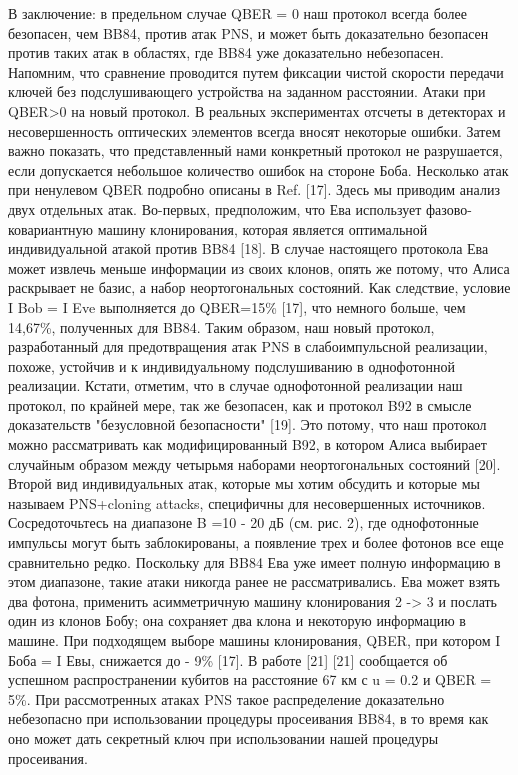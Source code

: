 В заключение: в предельном случае QBER = 0 наш протокол всегда более безопасен, чем BB84, против атак PNS, и может быть доказательно безопасен против таких атак в областях, где BB84 уже доказательно небезопасен. Напомним, что сравнение проводится путем фиксации чистой скорости передачи ключей без подслушивающего устройства на заданном расстоянии.
Атаки при QBER>0 на новый протокол. В реальных экспериментах отсчеты в детекторах и несовершенность оптических элементов всегда вносят некоторые ошибки.
Затем важно показать, что представленный нами конкретный протокол не разрушается, если допускается небольшое количество ошибок на стороне Боба. Несколько атак при ненулевом QBER подробно описаны в Ref. [17]. Здесь мы приводим анализ двух отдельных атак.
Во-первых, предположим, что Ева использует фазово-ковариантную машину клонирования, которая является оптимальной индивидуальной атакой против BB84 [18]. В случае настоящего протокола Ева может извлечь меньше информации из своих клонов, опять же потому, что Алиса раскрывает не базис, а набор неортогональных состояний. Как следствие, условие I Bob = I Eve выполняется до QBER=15\% [17], что немного больше, чем 14,67\%, полученных для BB84. Таким образом, наш новый протокол, разработанный для предотвращения атак PNS в слабоимпульсной реализации, похоже, устойчив и к индивидуальному подслушиванию в однофотонной реализации. Кстати, отметим, что в случае однофотонной реализации наш протокол, по крайней мере, так же безопасен, как и протокол B92 в смысле доказательств "безусловной безопасности" [19]. Это потому, что наш протокол можно рассматривать как модифицированный B92, в котором Алиса выбирает случайным образом между четырьмя наборами неортогональных состояний [20].
Второй вид индивидуальных атак, которые мы хотим обсудить и которые мы называем PNS+cloning attacks, специфичны для несовершенных источников. Сосредоточьтесь на диапазоне B =10 - 20 дБ (см. рис. 2), где однофотонные импульсы могут быть заблокированы, а появление трех и более фотонов все еще сравнительно редко. Поскольку для BB84 Ева уже имеет полную информацию в этом диапазоне, такие атаки никогда ранее не рассматривались. Ева может взять два фотона, применить асимметричную машину клонирования 2 -> 3 и послать один из клонов Бобу; она сохраняет два клона и некоторую информацию в машине. При подходящем выборе машины клонирования, QBER, при котором I Боба = I Евы, снижается до - 9\% [17]. В работе [21] [21] сообщается об успешном распространении кубитов на расстояние 67 км с u = 0.2 и QBER = 5\%. При рассмотренных атаках PNS такое распределение доказательно небезопасно при использовании процедуры просеивания BB84, в то время как оно может дать секретный ключ при использовании нашей процедуры просеивания.

